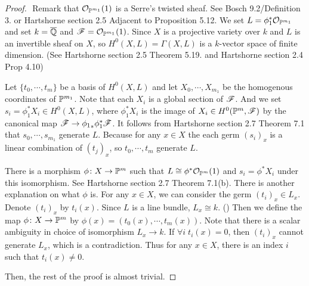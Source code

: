 \begin{proof} ${}$
  Remark that $\calo_{\P^{m_1}}(1)$ is a Serre's twisted sheaf. See Bosch\cite{Bosch} 9.2/Definition 3. or Hartshorne\cite{ha} section 2.5 Adjacent to Proposition 5.12.
We set $L = \phi_1^* \calo_{\P^{m_1}}$ and set $k = \ol{\Q}$ and $\scrf = \calo_{\P^{m_1}}(1)$. Since $X$ is a projective variety over $k$ and $L$ is an invertible sheaf on $X$, so $H^0(X,L) = \Gamma(X,L)$ is a $k$-vector space of finite dimension. (See Hartshorne\cite{ha} section 2.5 Theorem 5.19. and Hartshorne\cite{ha} section 2.4 Prop 4.10)

Let $\{ t_0, \cdots , t_m \}$ be a basis of $H^0(X,L)$ and let $X_0, \cdots , X_{m_1}$ be the homogenous coordinates of $\P^{m_1}$. Note that each $X_i$ is a global section of $\scrf$. And we set $s_i = \phi_1^* X_i \in H^0(X,L)$, where $\phi_1^* X_i$ is the image of $X_i \in H^0(\P^m, \scrf)$ by the canonical map $\scrf \to {\phi_1}_* \phi_1^* \scrf$.
It follows from Hartshorne\cite{ha} section 2.7 Theorem 7.1 that $s_0, \cdots , s_{m_1}$ generate $L$. Because for any $x \in X$ the each germ $(s_i)_x$ is a linear combination of $(t_j)_x$, so $t_0, \cdots ,t_m$ generate $L$.

There is a morphism $\phi \colon X \to \P^m $ such that $L \cong \phi^* \calo_{\P^m}(1)$ and $s_i = \phi^* X_i$ under this isomorphism. See Hartshorne\cite{ha} section 2.7 Theorem 7.1(b). There is another explanation on what $\phi$ is. For any $x \in X$, we can consider the germ $(t_i)_x \in L_x$. Denote $(t_i)_x$ by $t_i(x)$. Since $L$ is a line bundle, $L_x \cong k$. ()
Then we define the map $\phi \colon X \to \P^m$ by $\phi(x) = (t_0(x), \cdots , t_m(x))$. Note that there is a scalar ambiguity in choice of isomorphism $L_x \to k$. If $\forall i \; t_i(x) = 0$, then $(t_i)_x$ cannot generate $L_x$, which is a contradiction. Thus for any $x \in X$,
there is an index $i$ such that $t_i(x) \neq 0$.

Then, the rest of the proof is almost trivial.
\end{proof}
